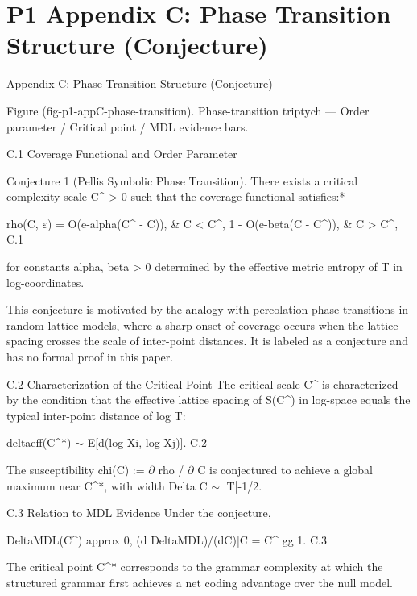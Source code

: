
\section{P1 Appendix C: Phase Transition Structure (Conjecture)}

Appendix C: Phase Transition Structure (Conjecture)

       Figure (fig-p1-appC-phase-transition). Phase-transition triptych --- Order parameter / Critical
                                       point / MDL evidence bars.

  C.1 Coverage Functional and Order Parameter

        Conjecture 1 (Pellis Symbolic Phase Transition). There exists a critical
        complexity scale C\textasciicircum{} > 0 such that the coverage functional satisfies:*

  rho(C, $\varepsilon$) = O(e-alpha(C\textasciicircum{} - C)), \& C < C\textasciicircum{}, 1 - O(e-beta(C - C\textasciicircum{})), \& C > C\textasciicircum{}, C.1

  for constants alpha, beta > 0 determined by the effective metric entropy of T in
  log-coordinates.

  This conjecture is motivated by the analogy with percolation phase transitions in
  random lattice models, where a sharp onset of coverage occurs when the lattice
  spacing crosses the scale of inter-point distances. It is labeled as a conjecture and has
  no formal proof in this paper.

  C.2 Characterization of the Critical Point
  The critical scale C\textasciicircum{} is characterized by the condition that the effective lattice spacing
  of S(C\textasciicircum{}) in log-space equals the typical inter-point distance of log T:

  deltaeff(C\textasciicircum{}*) $\sim$ E[d(log Xi, log Xj)]. C.2

  The susceptibility chi(C) := $\partial$ rho / $\partial$ C is conjectured to achieve a global maximum near
  C\textasciicircum{}*, with width Delta C $\sim$ |T|-1/2.

  C.3 Relation to MDL Evidence
  Under the conjecture,

  DeltaMDL(C\textasciicircum{}) approx 0, (d DeltaMDL)/(dC)|C = C\textasciicircum{} gg 1. C.3

  The critical point C\textasciicircum{}* corresponds to the grammar complexity at which the structured
  grammar first achieves a net coding advantage over the null model.

